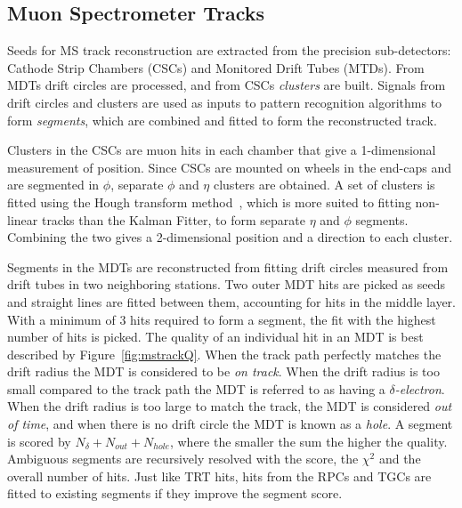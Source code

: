 \subsection{Muon Spectrometer Tracks}
\par Seeds for MS track reconstruction are extracted from the precision 
sub-detectors: Cathode Strip Chambers (CSCs) and Monitored Drift Tubes (MTDs).
From MDTs drift circles are processed, and from CSCs {\it clusters} are built.
Signals from drift circles and clusters are used as inputs to pattern recognition algorithms 
to form {\it segments}, which are combined and fitted to form the reconstructed track. 

\par Clusters in the CSCs are muon hits in each chamber that give a 1-dimensional measurement of 
position. Since CSCs are mounted on wheels in the end-caps and are segmented in $\phi$, separate 
$\phi$ and $\eta$ clusters are obtained. A set of clusters is fitted using the Hough transform 
method~\cite{Kiryati:1991:PHT:104022.104026}, which is more suited to fitting non-linear tracks than the Kalman Fitter, to form 
separate $\eta$ and $\phi$ segments. Combining the two gives a 2-dimensional position and a 
direction to each cluster.  

\par Segments in the MDTs are reconstructed from fitting drift circles measured from 
drift tubes in two neighboring stations. Two outer MDT hits are picked as seeds and straight 
lines are fitted between them, accounting for hits in the middle layer. With a minimum of 3 hits 
required to form a segment, the fit with the 
highest number of hits is picked. The quality of an individual hit in an MDT is best described by Figure~\ref{fig:mstrackQ}. 
When the track path perfectly matches the drift radius the MDT is considered to be {\it on track}.
When the drift radius is too small compared to the track path the MDT is referred to as having a {\it $\delta$-electron}.
When the drift radius is too large to match the track, the MDT is considered {\it out of time}, 
and when there is no drift circle the MDT is known as a {\it hole}. A segment is scored by 
$N_{\delta}+N_{out}+N_{hole}$, where the smaller the sum the higher the quality. Ambiguous 
segments are recursively resolved with the score, the $\chi^2$ and the overall 
number of hits. Just like TRT hits, hits from the RPCs and TGCs are fitted to existing segments if they improve 
the segment score. 

